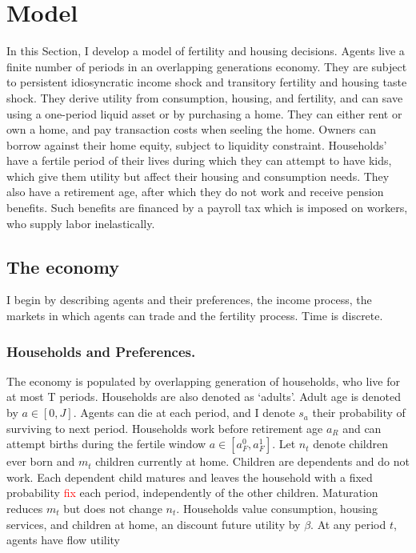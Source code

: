 \section{Model}
\label{sec:model}
In this Section, I develop a model of fertility and housing decisions. Agents live a finite number of periods in an overlapping generations economy. They are subject to persistent idiosyncratic income shock and transitory fertility and housing taste shock. They derive utility from consumption, housing, and fertility, and can save using a one-period liquid asset or by purchasing a home. They can either rent or own a home, and pay transaction costs when seeling the home. Owners can borrow against their home equity, subject to liquidity constraint. Households' have a fertile period of their lives during which they can attempt to have kids, which give them utility but affect their housing and consumption needs. They also have a retirement age, after which they do not work and receive pension benefits. Such benefits are financed by a payroll tax which is imposed on workers, who supply labor inelastically. 

\subsection{The economy}
I begin by describing agents and their preferences, the income process, the markets in which agents can trade and the fertility process. Time is discrete.

\subsubsection*{Households and Preferences.}
The economy is populated by overlapping generation of households, who live for at most T periods. Households are also denoted as `adults'. Adult age is denoted by $a\in[0,J]$. Agents can die at each period, and I denote $s_a$ their probability of surviving to next period.  Households work before retirement age $a_R$ and can attempt births during the
fertile window $a\in[a_F^0,a_F^1]$. Let $n_t$ denote children ever born and $m_t$ children currently
at home. Children are dependents and do not work. Each dependent child matures
and leaves the household with a fixed probability \textcolor{red}{fix} each period, independently
of the other children. Maturation reduces $m_t$ but does not change $n_t$. Households value consumption, housing services, and children at home, an discount future utility by $\beta$. At any period $t$, agents have flow utility

